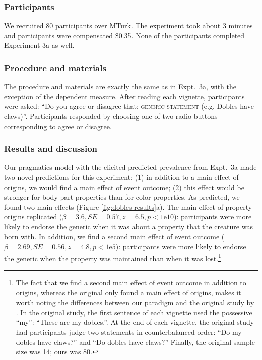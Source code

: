 \documentclass[12pt,letterpaper]{article}
\begin{document}
\subsubsection*{Participants}
We recruited 80 participants over MTurk.  
The experiment took about 3 minutes and participants were compensated \$0.35.
None of the participants completed Experiment 3a as well.

\subsubsection*{Procedure and materials}
The procedure and materials are exactly the same as in Expt.~3a, with the exception of the dependent measure.
After reading each vignette, participants were asked: ``Do you agree or disagree that: \textsc{generic statement} (e.g. Dobles have claws)''.
Participants responded by choosing one of two radio buttons corresponding to agree or disagree.

\subsubsection*{Results and discussion}


Our pragmatics model with the elicited predicted prevalence from Expt.~3a made two novel predictions for this experiment: (1) in addition to a main effect of origins, we would find a main effect of event outcome; (2) this effect would be stronger for body part properties than for color properties.
As predicted, we found two main effects (Figure \ref{fig:dobles-results}a).
The main effect of property origins replicated ($\beta=3.6, SE=0.57, z=6.5, p<1\text{e}10$): participants were more likely to endorse the generic when it was about a property that the creature was born with.
In addition, we find a second main effect of event outcome 
 ($\beta = 2.69, SE = 0.56, z=4.8, p<1\text{e}5$): participants were more likely to endorse the generic when the property was maintained than when it was lost.\footnote{The fact that we find a second main effect of event outcome in addition to origins, whereas the original only found a main effect of origins, makes it worth noting the differences between our paradigm and the original study by \citeauthor{Gelman2007}.
In the original study, the first sentence of each vignette used the possessive ``my'': ``These are my dobles.''.
At the end of each vignette, the original study had participants judge two statements in counterbalanced order: ``Do my dobles have claws?'' and ``Do dobles have claws?''
Finally, the original sample size was 14; ours was 80. 
}
\end{document}
